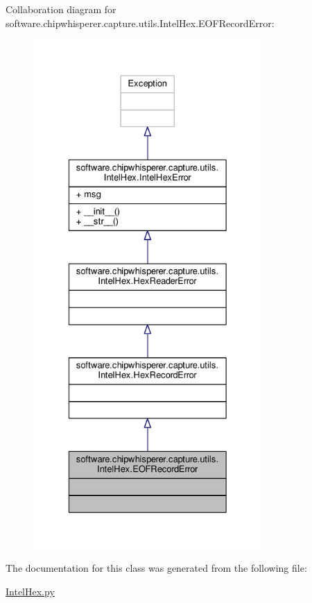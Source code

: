 Collaboration diagram for software.\+chipwhisperer.\+capture.\+utils.\+Intel\+Hex.\+E\+O\+F\+Record\+Error\+:\nopagebreak
\begin{figure}[H]
\begin{center}
\leavevmode
\includegraphics[height=550pt]{d9/d81/classsoftware_1_1chipwhisperer_1_1capture_1_1utils_1_1IntelHex_1_1EOFRecordError__coll__graph}
\end{center}
\end{figure}


The documentation for this class was generated from the following file\+:\begin{DoxyCompactItemize}
\item 
\hyperlink{IntelHex_8py}{Intel\+Hex.\+py}\end{DoxyCompactItemize}
